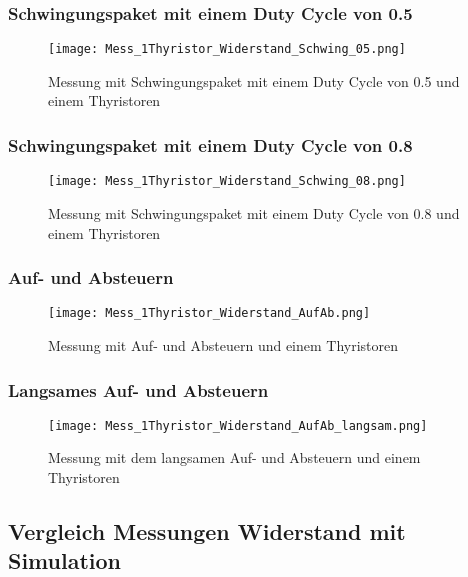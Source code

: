 \begin{appendix}
\newpage
\subsubsection*{Schwingungspaket mit einem Duty Cycle von 0.5}

\begin{figure}[ht]
	\centering
	\texttt{[image: Mess\_1Thyristor\_Widerstand\_Schwing\_05.png]}	
	\caption{Messung mit Schwingungspaket mit einem Duty Cycle von 0.5 und einem Thyristoren}\label{fig:Mess_1Thyristor_Schwing_50}
\end{figure}

\subsubsection*{Schwingungspaket mit einem Duty Cycle von 0.8}

\begin{figure}[ht]
	\centering
	\texttt{[image: Mess\_1Thyristor\_Widerstand\_Schwing\_08.png]}	
	\caption{Messung mit Schwingungspaket mit einem Duty Cycle von 0.8 und einem Thyristoren}\label{fig:Mess_1Thyristoren_Schwing_80}	
\end{figure}

\newpage
\subsubsection*{Auf- und Absteuern}

\begin{figure}[ht]
	\centering
	\texttt{[image: Mess\_1Thyristor\_Widerstand\_AufAb.png]}	
	\caption{Messung mit Auf- und Absteuern und einem Thyristoren}\label{Mess_1Thyristoren_Widerstand_AufAbFahren}	
\end{figure}


\subsubsection*{Langsames Auf- und Absteuern}

\begin{figure}[ht]
	\centering
	\texttt{[image: Mess\_1Thyristor\_Widerstand\_AufAb\_langsam.png]}	
	\caption{Messung mit dem langsamen Auf- und Absteuern und einem Thyristoren}\label{Mess_1Thyristoren_Widerstand_AufAbFahren_langsam}	
\end{figure}

\newpage
\subsection{Vergleich Messungen Widerstand mit Simulation}

\end{appendix}
